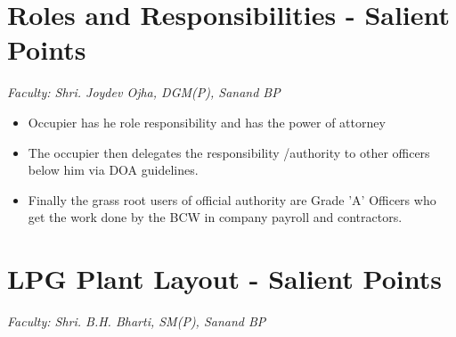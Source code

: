 \documentclass{report}
\begin{document}
	\section{Roles and Responsibilities - Salient Points}
	\textit{Faculty: Shri. Joydev Ojha, DGM(P), Sanand BP}
	\begin{itemize}
		\item Occupier has he role responsibility and has the power of attorney
		\item The occupier then delegates the responsibility /authority to other officers below him via DOA guidelines.
		\item Finally the grass root users of official authority are Grade 'A' Officers who get the work done by the BCW in company payroll and contractors.
	\end{itemize}
	\section{LPG Plant Layout - Salient Points}
	\textit{Faculty: Shri. B.H. Bharti, SM(P), Sanand BP}
\end{document}
